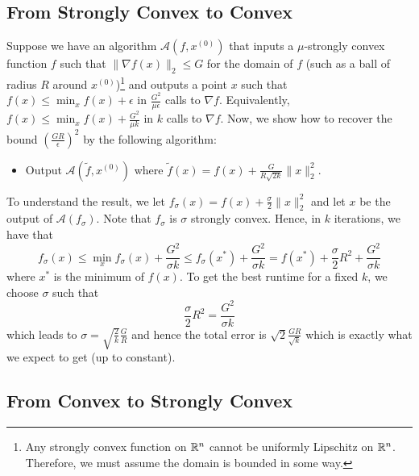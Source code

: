 \subsection*{From Strongly Convex to Convex}

Suppose we have an algorithm $\mathcal{A}(f,x^{(0)})$ that inputs
a $\mu$-strongly convex function $f$ such that $\|\nabla f(x)\|_{2}\leq G$
for the domain of $f$ (such as a ball of radius $R$ around $x^{(0)}$)\footnote{Any strongly convex function on $\mathbb{R}^{n}$ cannot be uniformly Lipschitz
on $\mathbb{R}^{n}$. Therefore, we must assume the domain is bounded in some
way.} and outputs a point $x$ such that $f(x)\leq\min_{x}f(x)+\epsilon$
in $\frac{G^{2}}{\mu\epsilon}$ calls to $\nabla f$. Equivalently,
$f(x)\leq\min_{x}f(x)+\frac{G^{2}}{\mu k}$ in $k$ calls to $\nabla f$.
Now, we show how to recover the bound $(\frac{GR}{\epsilon})^{2}$
by the following algorithm:
\begin{itemize}
\item Output $\mathcal{A}(\widetilde{f},x^{(0)})$ where $\widetilde{f}(x)=f(x)+\frac{G}{R\sqrt{2k}}\|x\|^{2}_{2}.$
\end{itemize}
To understand the result, we let $f_{\sigma}(x)=f(x)+\frac{\sigma}{2}\|x\|^{2}_{2}$
and let $x$ be the output of $\mathcal{A}(f_{\sigma})$. Note that
$f_{\sigma}$ is $\sigma$ strongly convex. Hence, in $k$ iterations,
we have that
\[
f_{\sigma}(x)\leq\min_{x}f_{\sigma}(x)+\frac{G^{2}}{\sigma k}\leq f_{\sigma}(x^{*})+\frac{G^{2}}{\sigma k}=f(x^{*})+\frac{\sigma}{2}R^{2}+\frac{G^{2}}{\sigma k}
\]
where $x^{*}$ is the minimum of $f(x)$. To get the best runtime
for a fixed $k$, we choose $\sigma$ such that 
\[
\frac{\sigma}{2}R^{2}=\frac{G^{2}}{\sigma k}
\]
which leads to $\sigma=\sqrt{\frac{2}{k}}\frac{G}{R}$ and hence the
total error is $\sqrt{2}\frac{GR}{\sqrt{k}}$ which is exactly what
we expect to get (up to constant).

\subsection*{From Convex to Strongly Convex}

